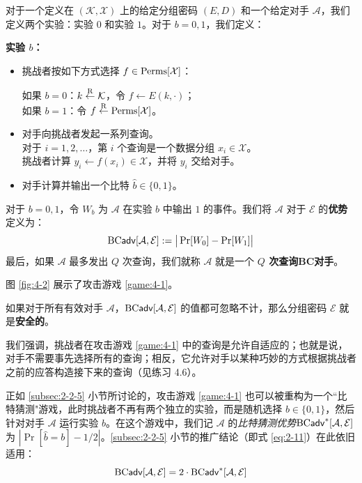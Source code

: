 \begin{game}[分组密码]\label{game:4-1}
对于一个定义在 $(\mathcal{K},\mathcal{X})$ 上的给定分组密码 $(E,D)$ 和一个给定对手 $\mathcal{A}$，我们定义两个实验：实验 $0$ 和实验 $1$。对于 $b=0,1$，我们定义：

\noindent\textbf{实验 $b$：}
\begin{itemize}
	\item 挑战者按如下方式选择 $f\in{\rm Perms}[\mathcal{X}]$：
	
	\hspace*{26pt} 如果 $b=0$：$k\overset{\rm R}\leftarrow\mathcal{K}$，令 $f\leftarrow E(k,\cdot)$；\\
	\hspace*{26pt} 如果 $b=1$：令 $f\overset{\rm R}\leftarrow{\rm Perms}[\mathcal{X}]$。
	
	\item 对手向挑战者发起一系列查询。\\
	对于 $i=1,2,\dots$，第 $i$ 个查询是一个数据分组 $x_i\in\mathcal{X}$。\\
	挑战者计算 $y_i\leftarrow f(x_i)\in\mathcal{X}$，并将 $y_i$ 交给对手。
	\item 对手计算并输出一个比特 $\hat b\in\{0,1\}$。
\end{itemize}

对于 $b=0,1$，令 $W_b$ 为 $\mathcal{A}$ 在实验 $b$ 中输出 $1$ 的事件。我们将 $\mathcal{A}$ 对于 $\mathcal{E}$ 的\textbf{优势}定义为：
\[
{\rm BC\mathsf{adv}}[\mathcal{A},\mathcal{E}]:=\big\lvert\Pr[W_0]-\Pr[W_1]\big\rvert
\]
最后，如果 $\mathcal{A}$ 最多发出 $Q$ 次查询，我们就称 $\mathcal{A}$ 就是一个 \textbf{$Q$ 次查询BC对手}。
\end{game}

图 \ref{fig:4-2} 展示了攻击游戏 \ref{game:4-1}。

\begin{definition}[安全的分组密码]\label{def:4-1}
如果对于所有有效对手 $\mathcal{A}$，${\rm BC\mathsf{adv}}[\mathcal{A},\mathcal{E}]$ 的值都可忽略不计，那么分组密码 $\mathcal{E}$ 就是\textbf{安全的}。
\end{definition}

我们强调，挑战者在攻击游戏 \ref{game:4-1} 中的查询是允许自适应的；也就是说，对手不需要事先选择所有的查询；相反，它允许对手以某种巧妙的方式根据挑战者之前的应答构造接下来的查询（见练习 4.6）。

正如 \ref{subsec:2-2-5} 小节所讨论的，攻击游戏 \ref{game:4-1} 也可以被重构为一个``比特猜测"游戏，此时挑战者不再有两个独立的实验，而是随机选择 $b\in\{0,1\}$，然后针对对手 $\mathcal{A}$ 运行实验 $b$。在这个游戏中，我们记 $\mathcal{A}$ 的\emph{比特猜测优势}${\rm BC\mathsf{adv}}^*[\mathcal{A},\mathcal{E}]$ 为 $|\Pr[\hat b = b]-{1}/{2}|$。\ref{subsec:2-2-5} 小节的推广结论（即式 \ref{eq:2-11}）在此依旧适用：
\begin{equation}
{\rm BC\mathsf{adv}}[\mathcal{A},\mathcal{E}]=2\cdot{\rm BC\mathsf{adv}}^*[\mathcal{A},\mathcal{E}]
\end{equation}

